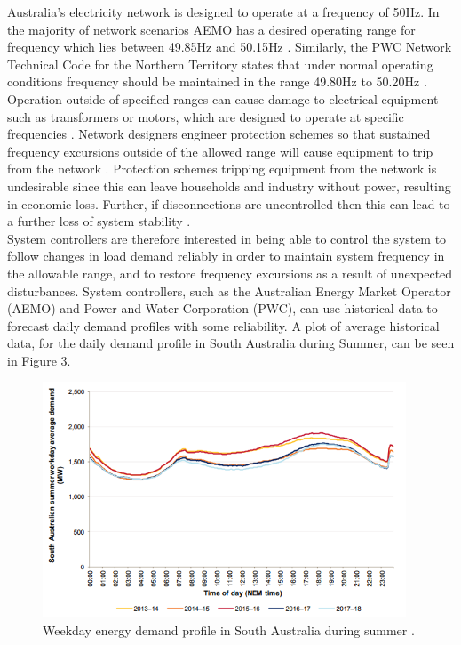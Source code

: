 \documentclass[12pt, a4paper]{article}
\begin{document}
Australia's electricity network is designed to operate at a frequency of 50$\si{\hertz}$. In the majority of network scenarios AEMO has a desired operating range for frequency which lies between 49.85$\si{\hertz}$ and 50.15$\si{\hertz}$ \cite{AEMO2012}. Similarly, the PWC Network Technical Code for the Northern Territory states that under normal operating conditions frequency should be maintained in the range 49.80$\si{\hertz}$ to 50.20$\si{\hertz}$ \cite{PWC2018}. Operation outside of specified ranges can cause damage to electrical equipment such as transformers or motors, which are designed to operate at specific frequencies \cite{Sen2014}. Network designers engineer protection schemes so that sustained frequency excursions outside of the allowed range will cause equipment to trip from the network \cite{AEMO201804}. Protection schemes tripping equipment from the network is undesirable since this can leave households and industry without power, resulting in economic loss. Further, if disconnections are uncontrolled then this can lead to a further loss of system stability \cite{AEMO201804}.\\

System controllers are therefore interested in being able to control the system to follow changes in load demand reliably in order to maintain system frequency in the allowable range, and to restore frequency excursions as a result of unexpected disturbances. System controllers, such as the Australian Energy Market Operator (AEMO) and Power and Water Corporation (PWC), can use historical data to forecast daily demand profiles with some reliability. A plot of average historical data, for the daily demand profile in South Australia during Summer, can be seen in Figure 3.  

\begin{figure}[h]
	\centering
	\includegraphics[height=7cm]{load_profile}
	\caption{Weekday energy demand profile in South Australia during summer \cite{AEMO2018}.}
\end{figure}
\end{document}
